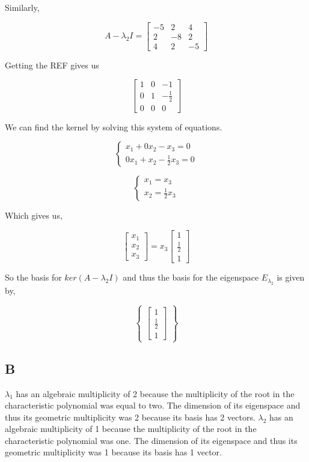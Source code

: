 \documentclass{article}
\begin{document}
Similarly,

\[ A - \lambda_2 I = \begin{bmatrix} -5 & 2 & 4 \\ 2 & -8 & 2 \\ 4 & 2 & -5 \end{bmatrix} \]

Getting the REF gives us

\[ \begin{bmatrix} 1 & 0 & -1 \\ 0 & 1 & -\frac{1}{2} \\ 0 & 0 & 0 \end{bmatrix} \]

We can find the kernel by solving this system of equations.

\[ \begin{cases}
	x_1 + 0x_2 - x_3 = 0 \\
	0x_1 + x_2 -\frac{1}{2}x_3 = 0
\end{cases} \]

\[ \begin{cases}
	x_1 = x_3 \\
	x_2 = \frac{1}{2}x_3
\end{cases} \]

Which gives us,

\[ \begin{bmatrix} x_1 \\ x_2 \\ x_3 \end{bmatrix} = x_3\begin{bmatrix} 1 \\ \frac{1}{2} \\ 1 \end{bmatrix} \]

So the basis for $ker(A-\lambda_2 I)$ and thus the basis for the eigenspace $E_{\lambda_2}$ is given by,

\[ \begin{Bmatrix} \begin{bmatrix} 1 \\ \frac{1}{2} \\ 1 \end{bmatrix} \end{Bmatrix} \]

\subsection*{B}
$\lambda_1$ has an algebraic multiplicity of 2 because the multiplicity of the root in the characteristic polynomial was equal to two. The dimension of its eigenspace and thus its geometric multiplicity was 2 because its basis has 2 vectors. $\lambda_2$ has an algebraic multiplicity of 1 because the multiplicity of the root in the characteristic polynomial was one. The dimension of its eigenspace and thus its geometric multiplicity was 1 because its basis has 1 vector. 
\end{document}
